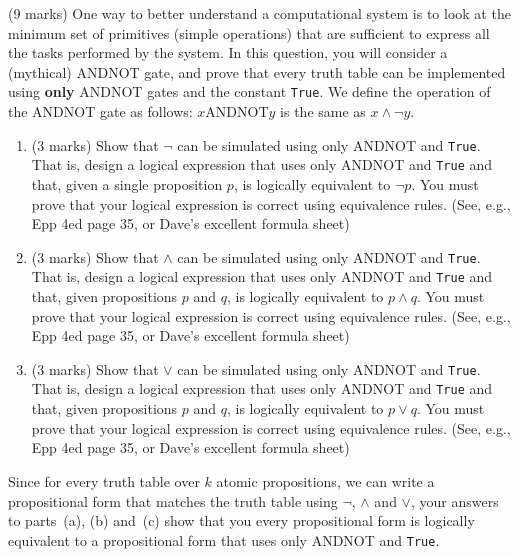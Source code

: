 \item (9 marks) One way to better understand a computational system is to look at the minimum set of primitives (simple operations) that are sufficient to express all the tasks performed by the system. In  this question, you will consider a (mythical)  ANDNOT gate, and prove that every  truth table  can be implemented  using \textbf {only}  ANDNOT gates  and the constant  \texttt  {True}. We  define  the  operation of  the  ANDNOT  gate as  follows: $x \textrm{ANDNOT} y$  is the same as  $x \land \lnot y$.
\begin{enumerate}
\item (3 marks) Show that $\lnot$ can be simulated using only ANDNOT and \texttt {True}. That is, design a logical expression that uses only ANDNOT and \texttt {True} and that, given a single proposition $p$, is logically equivalent to $\lnot p$. You must prove that your logical expression is correct using equivalence rules. (See, e.g., Epp 4ed page 35, or Dave's excellent formula sheet)
\vspace{4in}
\item (3 marks) Show that $\land$ can be simulated using only ANDNOT and \texttt {True}. That is, design a logical expression that uses only ANDNOT and \texttt {True} and that, given propositions $p$ and $q$, is logically equivalent to $p \land q$. You must prove that your logical expression is correct using equivalence rules. (See, e.g., Epp 4ed page 35, or Dave's excellent formula sheet)
\vspace{4in}
\item (3 marks)  Show that $\lor$ can be simulated using only ANDNOT and \texttt {True}. That is, design a logical expression that uses only ANDNOT and \texttt {True} and that, given propositions $p$ and $q$, is logically equivalent to $p \lor q$. You must prove that your logical expression is correct using equivalence rules. (See, e.g., Epp 4ed page 35, or Dave's excellent formula sheet)
\vspace{4in}
\end{enumerate}
Since for every truth table over $k$ atomic propositions, we can write a propositional form that matches the truth table using $\lnot$, $\land$ and $\lor$, your answers to parts~(a), (b) and~(c) show that you every propositional form is logically equivalent to a propositional form that uses only ANDNOT and \texttt {True}.

